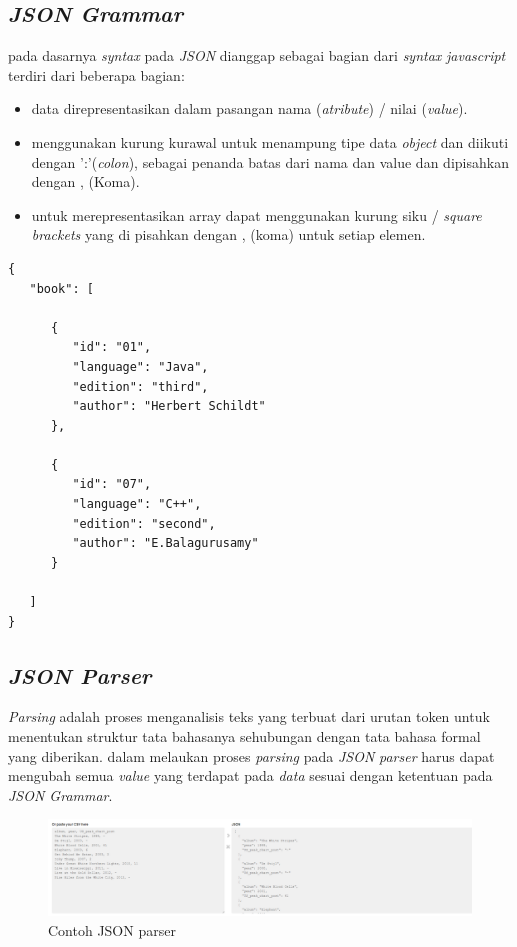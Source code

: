 \subsection{\textit{JSON Grammar}}
pada dasarnya  \textit{syntax} pada \textit{JSON} dianggap sebagai bagian dari \textit{syntax} \textit{javascript} terdiri dari beberapa bagian\cite{RFC:7159}:
\begin{itemize}
    \item  data direpresentasikan dalam pasangan nama (\textit{atribute}) / nilai  (\textit{value}).
    \item  menggunakan kurung kurawal untuk menampung tipe data \textit{object} dan diikuti dengan ':'(\textit{colon}), sebagai penanda batas dari nama dan value dan  dipisahkan dengan , (Koma).
    \item untuk merepresentasikan array dapat menggunakan kurung siku / \textit{square brackets } yang di pisahkan dengan , (koma) untuk setiap elemen.
\end{itemize}
   \begin{lstlisting}[caption=Contoh Struktur JSON, label=listing:JSON]
{
   "book": [

      {
         "id": "01",
         "language": "Java",
         "edition": "third",
         "author": "Herbert Schildt"
      },

      {
         "id": "07",
         "language": "C++",
         "edition": "second",
         "author": "E.Balagurusamy"
      }

   ]
}
\end{lstlisting}

\subsection{\textit{ JSON Parser}}
\textit{Parsing} adalah proses menganalisis teks yang terbuat dari urutan token untuk menentukan struktur tata bahasanya sehubungan dengan tata bahasa formal yang diberikan. dalam melaukan proses \textit{parsing} pada \textit{JSON} \textit{parser} harus dapat mengubah semua \textit{value} yang terdapat pada \textit{data} sesuai dengan ketentuan pada \textit{JSON Grammar}.
 \begin{figure}[H]
    \centering
    \includegraphics[scale=0.3]{Gambar/json-parser-example}
    \caption{Contoh JSON parser }
    \label{fig:my_label}
\end{figure}


